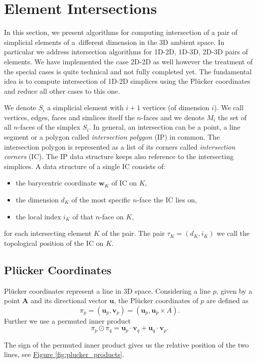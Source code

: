 \documentclass{elsarticle}
\newcommand{\fig}[1]{\hyperref[#1]{Figure \ref{#1}}}
\def\vc#1{\mathbf{\boldsymbol{#1}}}     %
\newcommand{\plucker}{Pl\"{u}cker }
\newcommand{\nface}{$n$-face }
\newcommand{\nfaces}{$n$-faces }
\begin{document}
\section{Element Intersections}
\label{sec:element intersecitons}
In this section, we present algorithms for computing intersection of a pair of simplicial elements of a~different dimension in the 3D ambient space. 
In particular we address intersection algorithms for 1D-2D, 1D-3D, 2D-3D pairs of elements. We have implemented the case 2D-2D as well however the treatment 
of the special cases is quite technical and not fully completed yet. The fundamental idea is to compute intersection of 1D-2D simplices using the 
\plucker coordinates and reduce all other cases to this one. 

We denote $S_i$ a simplicial element with $i+1$ vertices (of dimension $i$). We call vertices, edges, faces and simlices itself the \nfaces and we denote
$M_i$ the set of all \nfaces of the simplex $S_i$.
In general, an intersection can be a point, a line segment or a polygon called \emph{intersection polygon} (IP) in common.
The intersection polygon is represented as a list of its corners called \emph{intersection corners} (IC). The IP data structure keeps also 
reference to the intersecting simplices. A data structure of a single IC consists of:
\begin{itemize}
 \item the barycentric coordinate $\vc w_K$ of IC on $K$,
 \item the dimension $d_K$ of the most specific \nface the IC lies on,
 \item the local index $i_K$ of that \nface on $K$,
\end{itemize}
for each intersecting element $K$ of the pair. The pair $\tau_K = (d_K, i_K)$
we call the topological position of the IC on $K$.


\subsection{\plucker Coordinates}
\plucker coordinates represent a line in 3D space.
Considering a line $p$, given by a point $\vc A$ and its directional vector $\vc{u}$, 
the \plucker coordinates of $p$ are defined as
\[ \pi_p = (\vc{u}_p, \vc{v}_p) = (\vc{u}_p, \vc{u}_p\times A). \]
Further we use a permuted inner product
\[\pi_p \odot \pi_q = \vc{u}_p\cdot \vc{v}_q + \vc{u}_q \cdot \vc{v}_p. \]

The sign of the permuted inner product gives us the relative position of the two lines, 
see \fig{fig:plucker_products}.
\end{document}
